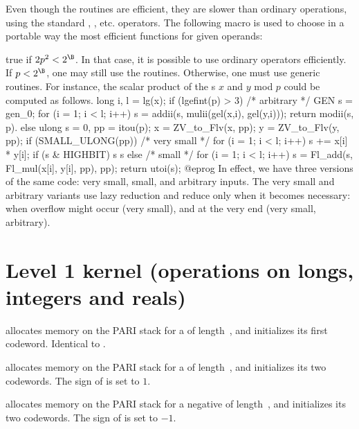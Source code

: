 
Even though the  routines are efficient, they are slower than
ordinary  operations, using the standard \kbd{+}, \kbd{\%}, etc.
operators.
The following macro is used to choose in a portable way the most efficient
functions for given operands:

 true if $2p^2 <2^\B$. In that case, it is
possible to use ordinary operators efficiently. If $p < 2^\B$, one
may still use the  routines. Otherwise, one must use generic
routines. For instance, the scalar product of the s $x$ and $y$ mod
$p$ could be computed as follows.
\bprog
    long i, l = lg(x);
    if (lgefint(p) > 3)
    { /* arbitrary */
      GEN s = gen_0;
      for (i = 1; i < l; i++) s = addii(s, mulii(gel(x,i), gel(y,i)));
      return modii(s, p).
    }
    else
    {
      ulong s = 0, pp = itou(p);
      x = ZV_to_Flv(x, pp);
      y = ZV_to_Flv(y, pp);
      if (SMALL_ULONG(pp))
      { /* very small */
        for (i = 1; i < l; i++)
        {
          s += x[i] * y[i];
          if (s & HIGHBIT) s %
        }
        s %
      }
      else
      { /* small */
        for (i = 1; i < l; i++)
          s = Fl_add(s, Fl_mul(x[i], y[i], pp), pp);
      }
      return utoi(s);
    }
@eprog\noindent
In effect, we have three versions of the same code: very small, small, and
arbitrary inputs. The very small and arbitrary variants use lazy reduction
and reduce only when it becomes necessary: when overflow might occur (very
small), and at the very end (very small, arbitrary).

\section{Level 1 kernel (operations on longs, integers and reals)}


 allocates memory on the PARI stack for a 
of length~, and initializes its first codeword. Identical to
.

 allocates memory on the PARI stack for a
 of length~, and initializes its two codewords. The sign
of  is set to $1$.

 allocates memory on the PARI stack for a negative
 of length~, and initializes its two codewords. The sign
of  is set to $-1$.

